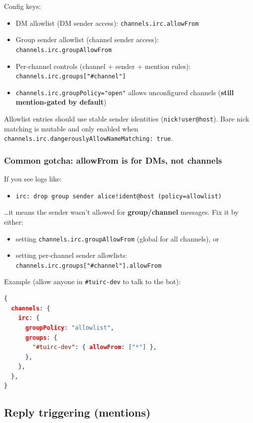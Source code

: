 Config keys:

\begin{itemize}
  \item DM allowlist (DM sender access): \texttt{channels.irc.allowFrom}
  \item Group sender allowlist (channel sender access): \texttt{channels.irc.groupAllowFrom}
  \item Per-channel controls (channel + sender + mention rules): \texttt{channels.irc.groups["\#channel"]}
  \item \texttt{channels.irc.groupPolicy="open"} allows unconfigured channels (\textbf{still mention-gated by default})
\end{itemize}


Allowlist entries should use stable sender identities (\texttt{nick!user@host}).
Bare nick matching is mutable and only enabled when \texttt{channels.irc.dangerouslyAllowNameMatching: true}.

\subsubsection{Common gotcha: allowFrom is for DMs, not channels}


If you see logs like:

\begin{itemize}
  \item \texttt{irc: drop group sender alice!ident@host (policy=allowlist)}
\end{itemize}


…it means the sender wasn’t allowed for \textbf{group/channel} messages. Fix it by either:

\begin{itemize}
  \item setting \texttt{channels.irc.groupAllowFrom} (global for all channels), or
  \item setting per-channel sender allowlists: \texttt{channels.irc.groups["\#channel"].allowFrom}
\end{itemize}


Example (allow anyone in \texttt{\#tuirc-dev} to talk to the bot):

\begin{lstlisting}[language=json]
{
  channels: {
    irc: {
      groupPolicy: "allowlist",
      groups: {
        "#tuirc-dev": { allowFrom: ["*"] },
      },
    },
  },
}
\end{lstlisting}


\subsection{Reply triggering (mentions)}


